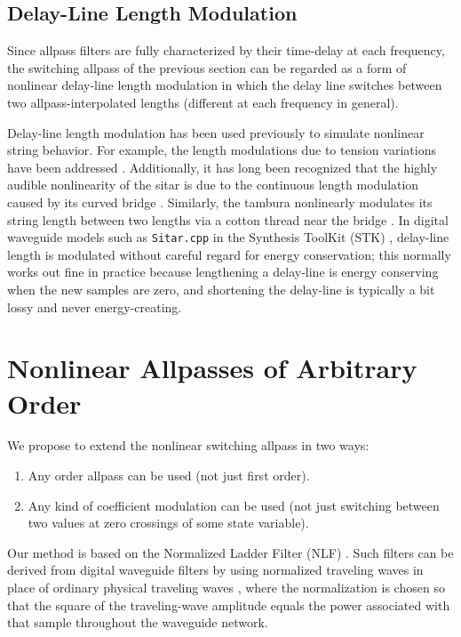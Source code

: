 \documentclass[twoside,a4paper]{article}
\begin{document}
\subsection{Delay-Line Length Modulation}

Since allpass filters are fully characterized by their time-delay at
each frequency, the switching allpass of the previous section can be
regarded as a form of nonlinear delay-line length modulation in which
the delay line switches between two allpass-interpolated lengths
(different at each frequency in general).

Delay-line length modulation has been used previously to simulate
nonlinear string behavior.  For example, the length modulations due to
tension variations have been addressed \cite{TolonenEtAl00}.
Additionally, it has long been recognized that the highly audible
nonlinearity of the sitar is due to the continuous length modulation
caused by its curved bridge \cite{FletcherAndRossing98}.  Similarly,
the tambura nonlinearly modulates its string length between two
lengths via a cotton thread near the bridge
\cite{FletcherAndRossing98}.  In digital waveguide models such as
\texttt{Sitar.cpp} in the Synthesis ToolKit (STK) \cite{STK4},
delay-line length is modulated without careful regard for energy
conservation; this normally works out fine in practice because
lengthening a delay-line is energy conserving when the new samples
are zero, and shortening the delay-line is typically a bit lossy
and never energy-creating.

\section{Nonlinear Allpasses of Arbitrary Order}

We propose to extend the nonlinear switching allpass in two ways:
\begin{enumerate}
\item Any order allpass can be used (not just first order).
\item Any kind of coefficient modulation can be used (not just
  switching between two values at zero crossings of some state variable).
\end{enumerate}
Our method is based on the Normalized Ladder Filter (NLF)
\cite{GrayAndMarkel75}. Such filters can be derived from digital
waveguide filters by using normalized traveling waves in place of
ordinary physical traveling waves \cite{PASP}, where the normalization
is chosen so that the square of the traveling-wave amplitude equals
the power associated with that sample throughout the waveguide
network.
\end{document}
